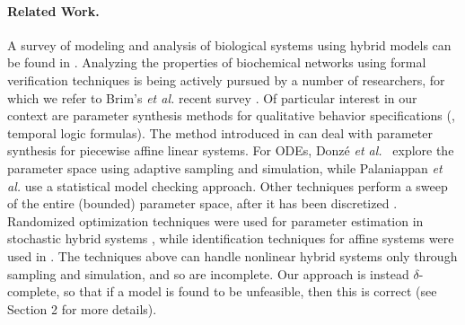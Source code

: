 \paragraph{Related Work.}
A survey of modeling and analysis of biological systems using hybrid models can be found in \cite{luca08}.
Analyzing the properties of biochemical networks using formal verification techniques is being actively
pursued by a number of researchers, for which we refer to Brim's {\em et al.} recent 
survey \cite{BrimSFM13}.
Of particular interest in our context are parameter synthesis methods for qualitative behavior 
specifications (\eg, temporal logic formulas). The method introduced in \cite{rovergene} can deal 
with parameter synthesis for piecewise affine linear systems. For ODEs, 
Donz\'{e} {\em et al.}~\cite{donze} explore the parameter space using adaptive sampling and simulation, 
while Palaniappan {\em et al.} \cite{liu13} use a statistical 
model checking approach. Other techniques perform a sweep of the entire (bounded) parameter space, 
after it has been discretized \cite{Calzone06,Donaldson08}. Randomized optimization techniques were used
for parameter estimation in stochastic hybrid systems \cite{Koutroumpas08}, while identification
techniques for affine systems were used in \cite{Cinquemani08}.
The techniques above can handle nonlinear hybrid systems only through sampling and 
simulation, and so are incomplete. Our approach is instead $\delta$-complete, so that if a model 
is found to be unfeasible, then this is correct (see Section 2 for more details).




